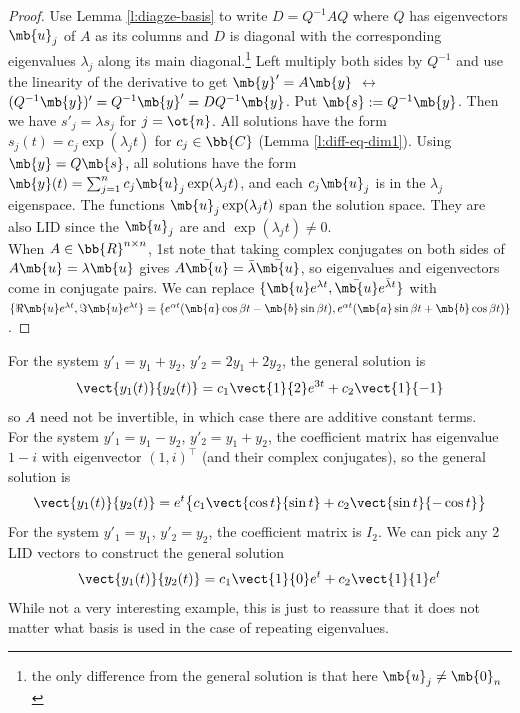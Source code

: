 \begin{proof}%
Use Lemma \ref{l:diagze-basis} to write $D=Q^{-1}AQ$ where $Q$ has eigenvectors $\mb{u}_j$ of $A$ as its columns and $D$ is diagonal with the corresponding eigenvalues $\lambda_j$ along its main diagonal.\footnote{the only difference from the general solution is that here $\mb{u}_j \neq \mb{0}_n$}
Left multiply both sides by $Q^{-1}$ and use the linearity of the derivative to get $\mb{y}'=A \mb{y}$ $\leftrightarrow$ $(Q^{-1}\mb{y})'=Q^{-1}\mb{y}'=DQ^{-1} \mb{y}$.
Put $\mb{s}:=Q^{-1}\mb{y}$. Then we have $s'_j= \lambda s_j$ for $j=\ot{n}$. All solutions have the form $s_j(t)=c_j \exp( \lambda_jt)$ for $c_j \in \bb{C}$ (Lemma \ref{l:diff-eq-dim1}).
Using  $\mb{y}=Q \mb{s}$, all solutions have the form $\mb{y}(t)= \sum_{j=1}^nc_j \mb{u}_j \exp( \lambda_jt)$, and each $c_j \mb{u}_j$ is in the $\lambda_j$ eigenspace.
The functions $\mb{u}_j \exp( \lambda_jt)$ span the solution space. They are also LID since the $\mb{u}_j$ are and $\exp( \lambda_jt) \neq 0$.\\
When $A \in \bb{R}^{n \times n}$, 1st note that taking complex conjugates on both sides of $A \mb{u}= \lambda \mb{u}$ gives $A \bar{\mb{u}}= \bar{\lambda}\bar{\mb{u}}$, so eigenvalues and eigenvectors come in conjugate pairs.
We can replace $\{ \mb{u}e^{ \lambda t}, \bar{\mb{u}}e^{ \bar{\lambda}t}\}$ with $\{ \Re \mb{u}e^{ \lambda t}, \Im \mb{u}e^{ \lambda t}\} = \{ e^{\alpha t}( \mb{a}\cos \beta t- \mb{b}\sin \beta t), e^{\alpha t}( \mb{a}\sin \beta t+ \mb{b}\cos \beta t) \}$.
\end{proof}
\begin{example}
For the system $y'_1=y_1+y_2$, $y'_2=2y_1+2y_2$, the general solution is
\[ \vect{y_1(t)}{y_2(t)}=c_1 \vect{1}{2}e^{3t}+c_2 \vect{1}{-1}\]
so $A$ need not be invertible, in which case there are additive constant terms.\\
For the system $y'_1=y_1-y_2$, $y'_2=y_1+y_2$, the coefficient matrix has eigenvalue $1-i$ with eigenvector $(1,i)^\top$ (and their complex conjugates), so the general solution is
\[ \vect{y_1(t)}{y_2(t)}=e^t \big\{ c_1 \vect{\cos t}{\sin t}+c_2 \vect{\sin t}{- \cos t}\big\} \]
For the system $y'_1=y_1$, $y'_2=y_2$, the coefficient matrix is $I_2$. We can pick any 2 LID vectors to construct the general solution
\[ \vect{y_1(t)}{y_2(t)}=c_1 \vect{1}{0}e^t+c_2 \vect{1}{1}e^t \]
While not a very interesting example, this is just to reassure that it does not matter what basis is used in the case of repeating eigenvalues.
\end{example}
